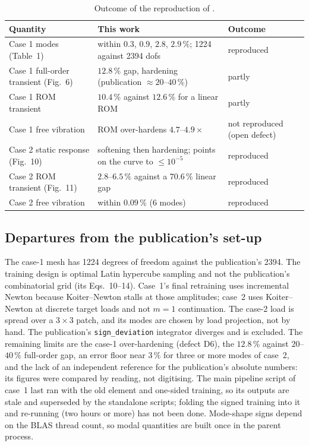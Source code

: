 \begin{table}[tbp]
\centering\footnotesize
\caption{Outcome of the reproduction of \citet{yang2019hybrid}.}\label{tab:vf-hy-cmp}
\begin{tabularx}{\linewidth}{@{}>{\raggedright\arraybackslash}p{3.8cm} >{\raggedright\arraybackslash}X >{\raggedright\arraybackslash}p{2.4cm}@{}}
\toprule
Quantity & This work & Outcome\\
\midrule
Case 1 modes (Table~1) & within $0.3$, $0.9$, $2.8$, $2.9\,\%$; 1224 against 2394 dofs & reproduced\\
Case 1 full-order transient (Fig.~6) & $12.8\,\%$ gap, hardening (publication $\approx20$--$40\,\%$) & partly\\
Case 1 ROM transient & $10.4\,\%$ against $12.6\,\%$ for a linear ROM & partly\\
Case 1 free vibration & ROM over-hardens $4.7$--$4.9\times$ & not reproduced (open defect)\\
Case 2 static response (Fig.~10) & softening then hardening; points on the curve to $\le10^{-5}$ & reproduced\\
Case 2 ROM transient (Fig.~11) & $2.8$--$6.5\,\%$ against a $70.6\,\%$ linear gap & reproduced\\
Case 2 free vibration & within $0.09\,\%$ (6 modes) & reproduced\\
\bottomrule
\end{tabularx}
\end{table}

\subsection*{Departures from the publication's set-up}

The case-1 mesh has 1224 degrees of freedom against the publication's 2394. The training design is optimal Latin hypercube sampling and not the publication's combinatorial grid (its Eqs.~10--14). Case~1's final retraining uses incremental Newton because Koiter--Newton stalls at those amplitudes; case~2 uses Koiter--Newton at discrete target loads and not $m=1$ continuation. The case-2 load is spread over a $3\times3$ patch, and its modes are chosen by load projection, not by hand. The publication's \texttt{sign\_deviation} integrator diverges and is excluded. The remaining limits are the case-1 over-hardening (defect D6), the $12.8\,\%$ against $20$--$40\,\%$ full-order gap, an error floor near $3\,\%$ for three or more modes of case~2, and the lack of an independent reference for the publication's absolute numbers: its figures were compared by reading, not digitising. The main pipeline script of case~1 last ran with the old element and one-sided training, so its outputs are stale and superseded by the standalone scripts; folding the signed training into it and re-running (two hours or more) has not been done. Mode-shape signs depend on the BLAS thread count, so modal quantities are built once in the parent process.
